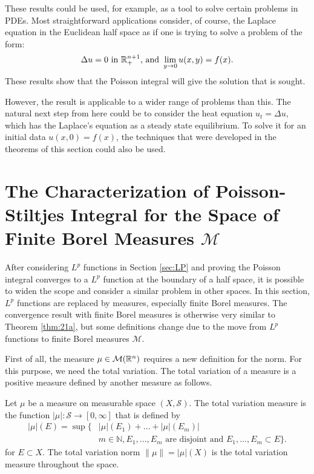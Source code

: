 These results could be used, for example, as a tool to solve certain problems in PDEs. Most straightforward applications consider, of course, the Laplace equation in the Euclidean half space as if one is trying to solve a problem of the form:
\begin{equation*}
    \Delta u=0\text{ in }\mathbb R^{n+1}_+\text{, and }\lim_{y\rightarrow0}u(x,y)=f(x).
\end{equation*}
These results show that the Poisson integral will give the solution that is sought.

However, the result is applicable to a wider range of problems than this. The natural next step from here could be to consider the heat equation $u_t=\Delta u$, which has the Laplace's equation as a steady state equilibrium. To solve it for an initial data $u(x,0)=f(x)$, the techniques that were developed in the theorems of this section could also be used.

\section{The Characterization of Poisson-Stiltjes Integral for the Space of Finite Borel Measures $\mathcal M$}

After considering $L^p$ functions in Section \ref{sec:LP} and proving the Poisson integral converges to a $L^p$ function at the boundary of a half space, it is possible to widen the scope and consider a similar problem in other spaces. In this section, $L^p$ functions are replaced by measures, especially finite Borel measures. The convergence result with finite Borel measures is otherwise very similar to Theorem \ref{thm:21a}, but some definitions change due to the move from $L^p$ functions to finite Borel measures $\mathcal M$.

First of all, the measure $\mu\in\mathcal M(\mathbb R^{n})$ requires a new definition for the norm. For this purpose, we need the total variation. The total variation of a measure is a positive measure defined by another measure as follows. 

\begin{definition}
    Let $\mu$ be a measure on measurable space $(X,\mathcal{S})$. The total variation measure is the function $|\mu|:\mathcal{S}\rightarrow [0,\infty]$ that is defined by
    \begin{align*}
        |\mu|(E) =\sup\{&|\mu|(E_1)+\ldots+|\mu|(E_m)|\\
        &m\in\mathbb{N}, E_1,\ldots,E_m\text{ are disjoint and }E_1,\ldots,E_m\subset E\}.
    \end{align*}
    for $E\subset X$. The total variation norm $\|\mu\|=|\mu|(X)$ is the total variation measure throughout the space.
\end{definition}

